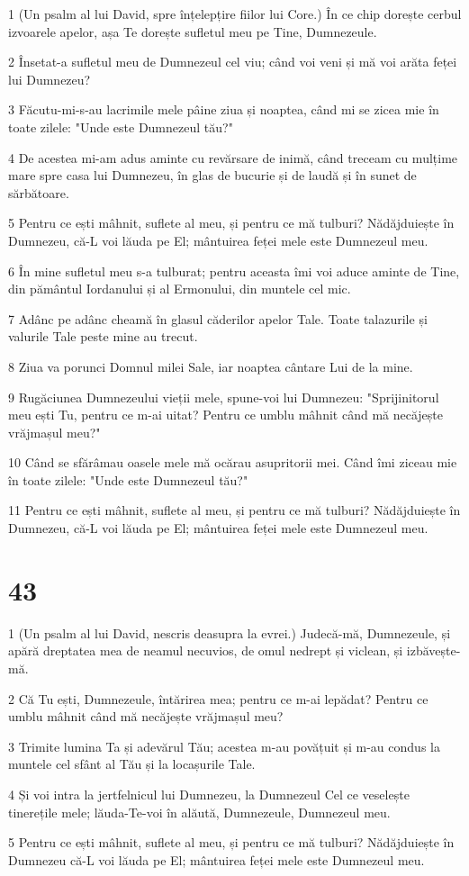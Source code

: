 \par 1 (Un psalm al lui David, spre înțelepțire fiilor lui Core.) În ce chip dorește cerbul izvoarele apelor, așa Te dorește sufletul meu pe Tine, Dumnezeule.
\par 2 Însetat-a sufletul meu de Dumnezeul cel viu; când voi veni și mă voi arăta feței lui Dumnezeu?
\par 3 Făcutu-mi-s-au lacrimile mele pâine ziua și noaptea, când mi se zicea mie în toate zilele: "Unde este Dumnezeul tău?"
\par 4 De acestea mi-am adus aminte cu revărsare de inimă, când treceam cu mulțime mare spre casa lui Dumnezeu, în glas de bucurie și de laudă și în sunet de sărbătoare.
\par 5 Pentru ce ești mâhnit, suflete al meu, și pentru ce mă tulburi? Nădăjduiește în Dumnezeu, că-L voi lăuda pe El; mântuirea feței mele este Dumnezeul meu.
\par 6 În mine sufletul meu s-a tulburat; pentru aceasta îmi voi aduce aminte de Tine, din pământul Iordanului și al Ermonului, din muntele cel mic.
\par 7 Adânc pe adânc cheamă în glasul căderilor apelor Tale. Toate talazurile și valurile Tale peste mine au trecut.
\par 8 Ziua va porunci Domnul milei Sale, iar noaptea cântare Lui de la mine.
\par 9 Rugăciunea Dumnezeului vieții mele, spune-voi lui Dumnezeu: "Sprijinitorul meu ești Tu, pentru ce m-ai uitat? Pentru ce umblu mâhnit când mă necăjește vrăjmașul meu?"
\par 10 Când se sfărâmau oasele mele mă ocărau asupritorii mei. Când îmi ziceau mie în toate zilele: "Unde este Dumnezeul tău?"
\par 11 Pentru ce ești mâhnit, suflete al meu, și pentru ce mă tulburi? Nădăjduiește în Dumnezeu, că-L voi lăuda pe El; mântuirea feței mele este Dumnezeul meu.

\chapter{43}

\par 1 (Un psalm al lui David, nescris deasupra la evrei.) Judecă-mă, Dumnezeule, și apără dreptatea mea de neamul necuvios, de omul nedrept și viclean, și izbăvește-mă.
\par 2 Că Tu ești, Dumnezeule, întărirea mea; pentru ce m-ai lepădat? Pentru ce umblu mâhnit când mă necăjește vrăjmașul meu?
\par 3 Trimite lumina Ta și adevărul Tău; acestea m-au povățuit și m-au condus la muntele cel sfânt al Tău și la locașurile Tale.
\par 4 Și voi intra la jertfelnicul lui Dumnezeu, la Dumnezeul Cel ce veselește tinerețile mele; lăuda-Te-voi în alăută, Dumnezeule, Dumnezeul meu.
\par 5 Pentru ce ești mâhnit, suflete al meu, și pentru ce mă tulburi? Nădăjduiește în Dumnezeu că-L voi lăuda pe El; mântuirea feței mele este Dumnezeul meu.

